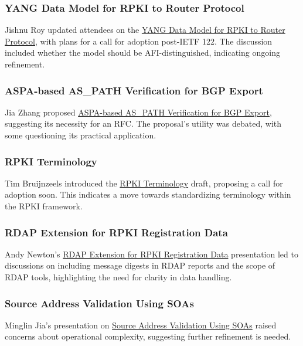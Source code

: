 \documentclass{article}
\begin{document}
\subsubsection{YANG Data Model for RPKI to Router Protocol}
Jishnu Roy updated attendees on the \href{https://datatracker.ietf.org/meeting/122/materials/slides-122-sidrops-yang-data-model-for-rpki-to-router-protocol-00}{YANG Data Model for RPKI to Router Protocol}, with plans for a call for adoption post-IETF 122. The discussion included whether the model should be AFI-distinguished, indicating ongoing refinement.

\subsubsection{ASPA-based AS\_PATH Verification for BGP Export}
Jia Zhang proposed \href{https://datatracker.ietf.org/meeting/122/materials/slides-122-sidrops-aspa-based-as-path-verification-for-bgp-export-slides-122-sidrops-aspa-egress-01-00}{ASPA-based AS\_PATH Verification for BGP Export}, suggesting its necessity for an RFC. The proposal's utility was debated, with some questioning its practical application.

\subsubsection{RPKI Terminology}
Tim Bruijnzeels introduced the \href{https://datatracker.ietf.org/meeting/122/materials/slides-122-sidrops-07-rpki-terminology-00}{RPKI Terminology} draft, proposing a call for adoption soon. This indicates a move towards standardizing terminology within the RPKI framework.

\subsubsection{RDAP Extension for RPKI Registration Data}
Andy Newton's \href{https://datatracker.ietf.org/meeting/122/materials/slides-122-sidrops-an-rdap-extension-for-rpki-registration-data-00}{RDAP Extension for RPKI Registration Data} presentation led to discussions on including message digests in RDAP reports and the scope of RDAP tools, highlighting the need for clarity in data handling.

\subsubsection{Source Address Validation Using SOAs}
Minglin Jia's presentation on \href{https://datatracker.ietf.org/meeting/122/materials/slides-122-sidrops-source-address-validation-using-source-origin-authorizations-soas-00}{Source Address Validation Using SOAs} raised concerns about operational complexity, suggesting further refinement is needed.
\end{document}
